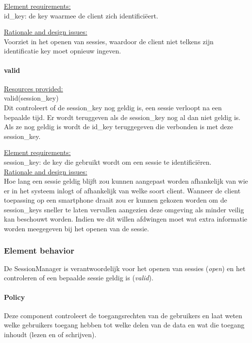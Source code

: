 \documentclass[a4paper,10pt]{article}
\begin{document}
\underline{Element requirements:}\\
id\_key: de key waarmee de client zich identifici\"{e}ert.

\underline{Rationale and design issues:}\\
Voorziet in het openen van sessies, waardoor de client niet telkens zijn identificatie key moet opnieuw ingeven.

\paragraph{valid}
\underline{Resources provided:}\\
valid(session\_key)\\
Dit controleert of de session\_key nog geldig is, een sessie verloopt na een bepaalde tijd.  Er wordt teruggeven als de session\_key nog al dan niet geldig is.  Als ze nog geldig is wordt de id\_key teruggegeven die verbonden is met deze session\_key.

\underline{Element requirements:}\\
session\_key: de key die gebruikt wordt om een sessie te identifici\"{e}ren.\\

\underline{Rationale and design issues:}\\
Hoe lang een sessie geldig blijft zou kunnen aangepast worden afhankelijk van wie er in het systeem inlogt of afhankelijk van welke soort client.  Wanneer de client toepassing op een smartphone draait zou er kunnen gekozen worden om de session\_keys sneller te laten vervallen aangezien deze omgeving als minder veilig kan beschouwt worden.  Indien we dit willen afdwingen moet wat extra informatie worden meegegeven bij het openen van de sessie.

\subsubsection{Element behavior}
De SessionManager is verantwoordelijk voor het openen van sessies (\textit{open}) en het controleren of een bepaalde sessie geldig is (\textit{valid}).

\paragraph{Policy}
Deze component controleert de toegangsrechten van de gebruikers en laat weten welke gebruikers toegang hebben tot welke delen van de data en wat die toegang inhoudt (lezen en of schrijven).
\end{document}
